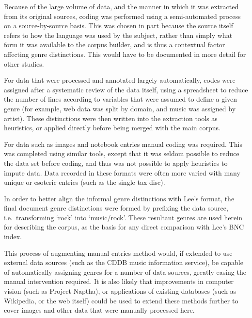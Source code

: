 Because of the large volume of data, and the manner in which it was extracted from its original sources, coding was performed using a semi-automated process on a source-by-source basis.  This was chosen in part because the source itself refers to how the language was used by the subject, rather than simply what form it was available to the corpus builder, and is thus a contextual factor affecting genre distinctions.  This would have to be documented in more detail for other studies.

For data that were processed and annotated largely automatically, codes were assigned after a systematic review of the data itself, using a spreadsheet to reduce the number of lines according to variables that were assumed to define a given genre (for example, web data was split by domain, and music was assigned by artist).  These distinctions were then written into the extraction tools as heuristics, or applied directly before being merged with the main corpus.

For data such as images and notebook entries manual coding was required.  This was completed using similar tools, except that it was seldom possible to reduce the data set before coding, and thus was not possible to apply heuristics to impute data.  Data recorded in these formats were often more varied with many unique or esoteric entries (such as the single tax disc).

In order to better align the informal genre distinctions with Lee's format, the final document genre distinctions were formed by prefixing the data source, i.e.\ transforming `rock' into `music/rock'.  These resultant genres are used herein for describing the corpus, as the basis for any direct comparison with Lee's BNC index.




This process of augmenting manual entries method would, if extended to use external data sources (such as the CDDB music information service), be capable of automatically assigning genres for a number of data sources, greatly easing the manual intervention required.  It is also likely that improvements in computer vision (such as Project Naptha\cite{naptha2014homepage}), or applications of existing databases (such as Wikipedia, or the web itself) could be used to extend these methods further to cover images and other data that were manually processed here.
